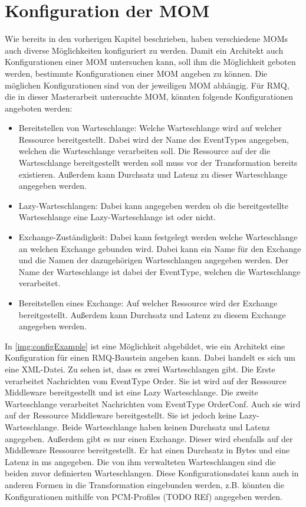 \section{Konfiguration der MOM}
Wie bereits in den vorherigen Kapitel beschrieben, haben verschiedene MOMs auch diverse Möglichkeiten konfiguriert zu werden. Damit ein Architekt auch Konfigurationen einer MOM untersuchen kann, soll ihm die Möglichkeit geboten werden, bestimmte Konfigurationen einer MOM angeben zu können. Die möglichen Konfigurationen sind von der jeweiligen MOM abhängig. Für RMQ, die in dieser Masterarbeit untersuchte MOM, könnten folgende Konfigurationen angeboten werden:
\begin{itemize}
    \item Bereitstellen von Warteschlange: Welche Warteschlange wird auf welcher Ressource bereitgestellt. Dabei wird der Name des EventTypes angegeben, welchen die Warteschlange verarbeiten soll. Die Ressource auf der die Warteschlange bereitgestellt werden soll muss vor der Transformation bereits existieren. Außerdem kann Durchsatz und Latenz zu dieser Warteschlange angegeben werden.
    \item Lazy-Warteschlangen: Dabei kann angegeben werden ob die bereitgestellte Warteschlange eine Lazy-Warteschlange ist oder nicht. 
    \item Exchange-Zuständigkeit: Dabei kann festgelegt werden welche Warteschlange an welchen Exchange gebunden wird. Dabei kann ein Name für den Exchange und die Namen der dazugehörigen Warteschlangen angegeben werden. Der Name der Warteschlange ist dabei der EventType, welchen die Warteschlange verarbeitet.
    \item Bereitstellen eines Exchange: Auf welcher Ressource wird der Exchange bereitgestellt. Außerdem kann Durchsatz und Latenz zu diesem Exchange angegeben werden.
\end{itemize}
In \autoref{img:configExample} ist eine Möglichkeit abgebildet, wie ein Architekt eine Konfiguration für einen RMQ-Baustein angeben kann. Dabei handelt es sich um eine XML-Datei. Zu sehen ist, dass es zwei Warteschlangen gibt. Die Erste verarbeitet Nachrichten vom EventType Order. Sie ist wird auf der Ressource Middleware bereitgestellt und ist eine Lazy Warteschlange. Die zweite Warteschlange verarbeitet Nachrichten vom EventType OrderConf. Auch sie wird auf der Ressource Middleware bereitgestellt. Sie ist jedoch keine Lazy-Warteschlange. Beide Warteschlange haben keinen Durchsatz und Latenz angegeben. Außerdem gibt es nur einen Exchange. Dieser wird ebenfalls auf der Middleware Ressource bereitgestellt. Er hat einen Durchsatz in Bytes und eine Latenz in ms angegeben. Die von ihm verwalteten Warteschlangen sind die beiden zuvor definierten Warteschlangen. Diese Konfigurationsdatei kann auch in anderen Formen in die Transformation eingebunden werden, z.B. könnten die Konfigurationen mithilfe von PCM-Profiles (TODO REf) angegeben werden.

